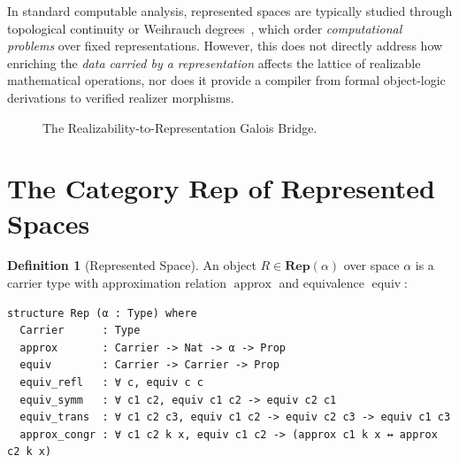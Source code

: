 \documentclass[11pt,a4paper]{article}
\theoremstyle{definition}
\newtheorem{definition}[theorem]{Definition}
\theoremstyle{remark}
\newcommand{\HAomega}{\ensuremath{\mathrm{HA}^\omega}}
\newcommand{\Rep}{\ensuremath{\mathbf{Rep}}}
\newcommand{\Th}{\ensuremath{\operatorname{Th}}}
\newcommand{\Req}{\ensuremath{\operatorname{Req}}}
\newcommand{\preceqR}{\ensuremath{\preceq}}
\begin{document}
In standard computable analysis, represented spaces are typically studied through topological continuity or Weihrauch degrees~\cite{brattka2021}, which order \emph{computational problems} over fixed representations. However, this does not directly address how enriching the \emph{data carried by a representation} affects the lattice of realizable mathematical operations, nor does it provide a compiler from formal object-logic derivations to verified realizer morphisms.

\begin{figure}[htbp]
\centering
{}
\caption{The Realizability-to-Representation Galois Bridge.}
\end{figure}

\section{The Category $\Rep$ of Represented Spaces}

\begin{definition}[Represented Space]
An object $R \in \Rep(\alpha)$ over space $\alpha$ is a carrier type with approximation relation $\operatorname{approx}$ and equivalence $\operatorname{equiv}$:
\begin{lstlisting}[language=Lean]
structure Rep (α : Type) where
  Carrier      : Type
  approx       : Carrier -> Nat -> α -> Prop
  equiv        : Carrier -> Carrier -> Prop
  equiv_refl   : ∀ c, equiv c c
  equiv_symm   : ∀ c1 c2, equiv c1 c2 -> equiv c2 c1
  equiv_trans  : ∀ c1 c2 c3, equiv c1 c2 -> equiv c2 c3 -> equiv c1 c3
  approx_congr : ∀ c1 c2 k x, equiv c1 c2 -> (approx c1 k x ↔ approx c2 k x)
\end{lstlisting}
\end{definition}
\end{document}

